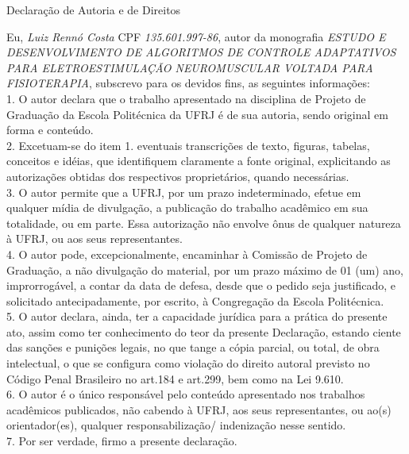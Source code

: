\begin{center}
	Declaração de Autoria e de Direitos
\end{center}

\vspace{0.5cm}

Eu, \emph{Luiz Rennó Costa} CPF \emph{135.601.997-86}, autor da monografia \emph{ESTUDO E DESENVOLVIMENTO DE ALGORITMOS DE CONTROLE ADAPTATIVOS PARA ELETROESTIMULAÇÃO NEUROMUSCULAR VOLTADA PARA FISIOTERAPIA}, subscrevo para os devidos fins, as seguintes informações:\\
1. O autor declara que o trabalho apresentado na disciplina de Projeto de Graduação da Escola Politécnica da UFRJ é de sua autoria, sendo original em forma e conteúdo.\\
2. Excetuam-se do item 1. eventuais transcrições de texto, figuras, tabelas, conceitos e idéias, que identifiquem claramente a fonte original, explicitando as autorizações obtidas dos respectivos proprietários, quando necessárias.\\
3. O autor permite que a UFRJ, por um prazo indeterminado, efetue em qualquer mídia de divulgação, a publicação do trabalho acadêmico em sua totalidade, ou em parte. Essa autorização não envolve ônus de qualquer natureza à UFRJ, ou aos seus representantes.\\
4. O autor pode, excepcionalmente, encaminhar à Comissão de Projeto de Graduação, a não divulgação do material, por um prazo máximo de 01 (um) ano, improrrogável, a contar da data de defesa, desde que o pedido seja justificado, e solicitado antecipadamente, por escrito, à Congregação da Escola Politécnica.\\
5. O autor declara, ainda, ter a capacidade jurídica para a prática do presente ato, assim como ter conhecimento do teor da presente Declaração, estando ciente das sanções e punições legais, no que tange a cópia parcial, ou total, de obra intelectual, o que se configura como violação do direito autoral previsto no Código Penal Brasileiro no art.184 e art.299, bem como na Lei 9.610.\\
6. O autor é o único responsável pelo conteúdo apresentado nos trabalhos acadêmicos publicados, não cabendo à UFRJ, aos seus representantes,  ou ao(s) orientador(es), qualquer responsabilização/ indenização nesse sentido.\\
7. Por ser verdade, firmo a presente declaração.\\

\vspace{0.5cm}
\begin{flushright}
	\parbox{10cm}{
		\hrulefill
		
		\vspace{-.375cm}
		
		\vspace{0.1cm}
	}
\end{flushright}

